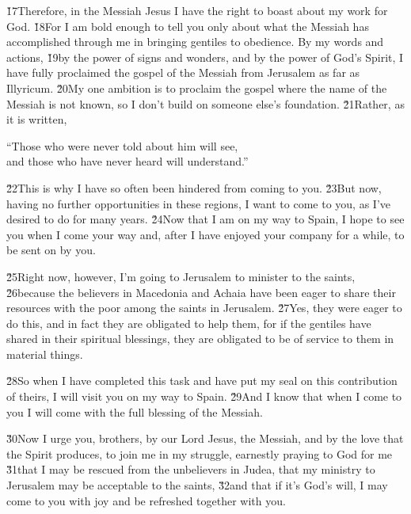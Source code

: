 \v{17}Therefore, in the Messiah Jesus I have the right to boast about my work for God. \v{18}For I am bold enough to tell you only about what the Messiah has accomplished through me in bringing gentiles to obedience. By my words and actions, \v{19}by the power of signs and wonders, and by the power of God's Spirit, I have fully proclaimed the gospel of the Messiah from Jerusalem as far as Illyricum. \v{20}My one ambition is to proclaim the gospel where the name of the Messiah is not known, so I don't build on someone else's foundation. \v{21}Rather, as it is written,

\begin{poetry}
\poeml ``Those who were never told about him will see, \\
\poemll    and those who have never heard will understand.''
\end{poetry}

\v{22}This is why I have so often been hindered from coming to you. \v{23}But now, having no further opportunities in these regions, I want to come to you, as I've desired to do for many years. \v{24}Now that I am on my way to Spain, I hope to see you when I come your way and, after I have enjoyed your company for a while, to be sent on by you.

\v{25}Right now, however, I'm going to Jerusalem to minister to the saints, \v{26}because the believers in Macedonia and Achaia have been eager to share their resources with the poor among the saints in Jerusalem. \v{27}Yes, they were eager to do this, and in fact they are obligated to help them, for if the gentiles have shared in their spiritual blessings, they are obligated to be of service to them in material things.

\v{28}So when I have completed this task and have put my seal on this contribution of theirs, I will visit you on my way to Spain. \v{29}And I know that when I come to you I will come with the full blessing of the Messiah.

\v{30}Now I urge you, brothers, by our Lord Jesus, the Messiah, and by the love that the Spirit produces, to join me in my struggle, earnestly praying to God for me \v{31}that I may be rescued from the unbelievers in Judea, that my ministry to Jerusalem may be acceptable to the saints, \v{32}and that if it's God's will, I may come to you with joy and be refreshed together with you.

